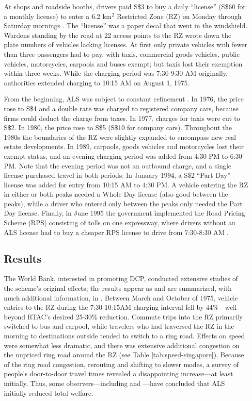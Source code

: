 At shops and roadside booths, drivers paid S\$3 to buy a daily ``license'' (S\$60 for a monthly license) to enter a 6.2 km$^{2}$ Restricted Zone (RZ) on Monday through Saturday mornings \citep{WatsonHolland1978}. The ``license'' was a paper decal that went in the windshield. Wardens standing by the road at 22 access points to the RZ wrote down the plate numbers of vehicles lacking licenses. At first only private vehicles with fewer than three passengers had to pay, with taxis, commercial goods vehicles, public vehicles, motorcycles, carpools and buses exempt; but taxis lost their exemption within three weeks. While the charging period was 7:30-9:30 AM originally, authorities  extended charging to 10:15 AM on August 1, 1975. 

From the beginning, ALS was subject to constant refinement \citep{Gomez-Ibanez1994, PhangToh1997}. In 1976, the price rose to S\$4 and a double rate was charged to registered company cars, because firms could deduct the charge from taxes. In 1977, charges for taxis were cut to S\$2. In 1980, the price rose to S\$5 (S\$10 for company cars). Throughout the 1980s the boundaries of the RZ were slightly expanded to encompass new real estate developments. In 1989, carpools, goods vehicles and motorcycles lost their exempt status, and an evening charging period was added from 4:30 PM to 6:30 PM. Note that the evening period was not an outbound charge, and a single license purchased travel in both periods. In January 1994, a S\$2 ``Part Day'' license was added for entry from 10:15 AM to 4:30 PM. A vehicle entering the RZ in either or both peaks needed a Whole Day license (also good between the peaks), while a driver who entered only between the peaks only needed the Part Day license. Finally, in June 1995 the government implemented the Road Pricing Scheme (RPS) consisting of tolls on one expressway, where drivers without an ALS license had to buy a cheaper RPS license to drive from 7:30-8:30 AM \citep{PhangToh2004}.

\subsection{Results}

The World Bank, interested in promoting DCP, conducted extensive studies of the scheme's original effects; the results appear as \citet{WatsonHolland1978} and are summarized, with much additional information, in \citet{Gomez-Ibanez1994}. Between March and October of 1975, vehicle entries to the RZ during the 7:30-10:15AM charging interval fell by 44\%---well beyond RTAC's desired 25-30\% reduction. Commute trips into the RZ primarily switched to bus and carpool, while travelers who had traversed the RZ in the morning to destinations outside tended to switch to a ring road. Effects on speed were somewhat less dramatic, and there was extensive additional congestion on the unpriced ring road around the RZ (see Table \ref{tab:speed-singapore}). Because of the ring road congestion, rerouting and shifting to slower modes, a survey of people's door-to-door travel times revealed a disappointing increase---at least initially. Thus, some observers---including \citet{Wilson1988a} and \citet{McCarthyTay1993}---have concluded that ALS initially reduced total welfare.

